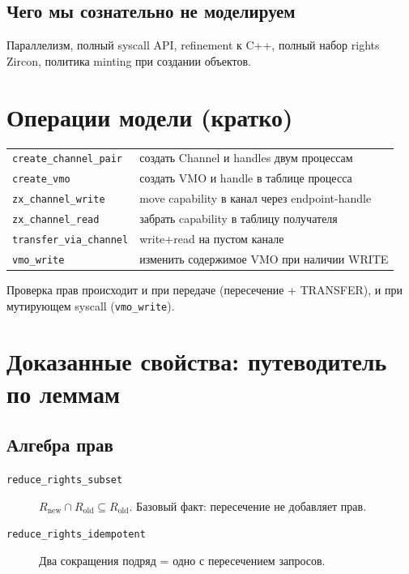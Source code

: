 \documentclass[11pt,a4paper]{article}
\begin{document}
\subsection{Чего мы сознательно не моделируем}

Параллелизм, полный syscall API, refinement к C++, полный набор rights
Zircon, политика minting при создании объектов.

\section{Операции модели (кратко)}

\begin{center}
\begin{tabular}{ll}
\texttt{create\_channel\_pair} & создать Channel и handles двум процессам \\
\texttt{create\_vmo} & создать VMO и handle в таблице процесса \\
\texttt{zx\_channel\_write} & move capability в канал через endpoint-handle \\
\texttt{zx\_channel\_read} & забрать capability в таблицу получателя \\
\texttt{transfer\_via\_channel} & write+read на пустом канале \\
\texttt{vmo\_write} & изменить содержимое VMO при наличии WRITE
\end{tabular}
\end{center}

Проверка прав происходит и при передаче (пересечение + TRANSFER), и при
мутирующем syscall (\texttt{vmo\_write}).

\section{Доказанные свойства: путеводитель по леммам}

\subsection{Алгебра прав}

\begin{description}
  \item[\texttt{reduce\_rights\_subset}]
        $R_{\mathrm{new}} \cap R_{\mathrm{old}} \subseteq R_{\mathrm{old}}$.
        Базовый факт: пересечение не добавляет прав.
  \item[\texttt{reduce\_rights\_idempotent}]
        Два сокращения подряд = одно с пересечением запросов.
\end{description}
\end{document}
